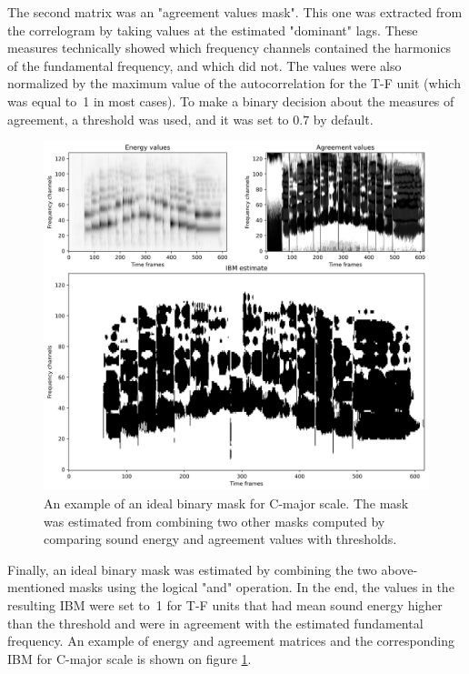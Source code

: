 The second matrix was an "agreement values mask". This one was extracted from the correlo\-gram by taking values at the estimated "dominant" lags. These measures technically showed which frequency channels contained the harmonics of the fundamental frequency, and which did not. The values were also normalized by the maximum value of the autocorrelation for the T-F unit (which was equal to~1 in most cases). To make a binary decision about the measures of agreement, a threshold was used, and it was set to $0.7$ by default.\\

\begin{figure}[t]
	\centering
	\includegraphics[width=\textwidth]{include/ibm_example}
	\caption[An example of an ideal binary mask for C-major scale]{An example of an ideal binary mask for C-major scale. The mask was estimated from combining two other masks computed by comparing sound energy and agreement values with thresholds.}
	\label{img:ibm_example}
\end{figure}

Finally, an ideal binary mask was estimated by combining the two above-mentioned masks using the logical "and" operation. In the end, the values in the resulting IBM were set to~1 for T-F units that had mean sound energy higher than the threshold and were in agreement with the estimated fundamental frequency. An example of energy and agreement matrices and the corresponding IBM for C-major scale is shown on figure \ref{img:ibm_example}.\\

